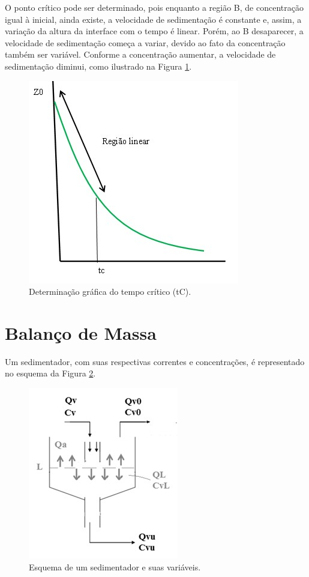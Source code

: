 O ponto crítico pode ser determinado, pois enquanto a região B, de concentração igual à inicial, ainda existe, a velocidade de sedimentação é constante e, assim, a variação da altura da interface com o tempo é linear. Porém, ao B desaparecer, a velocidade de sedimentação começa a variar, devido ao fato da concentração também ser variável. Conforme a concentração aumentar, a velocidade de sedimentação diminui, como ilustrado na Figura \ref{linearReg}.


\begin{figure}[H]
	\begin{center}
		\includegraphics[scale=.5,trim={0 0 0 0}]{figuras/ladeq/sedi/graphProv2}
		\caption{Determinação gráfica do tempo crítico (tC).}
		\label{linearReg}
	\end{center}
\end{figure}

\section{Balanço de Massa}

Um sedimentador, com suas respectivas correntes e concentrações, é representado no esquema da Figura \ref{esquema}.

\begin{figure}[H]
	\begin{center}
		\includegraphics[scale=.5,trim={0 0 0 0}]{figuras/ladeq/sedi/aparato}
		\caption{Esquema de um sedimentador e suas variáveis.}
		\label{esquema}
	\end{center}
\end{figure}

